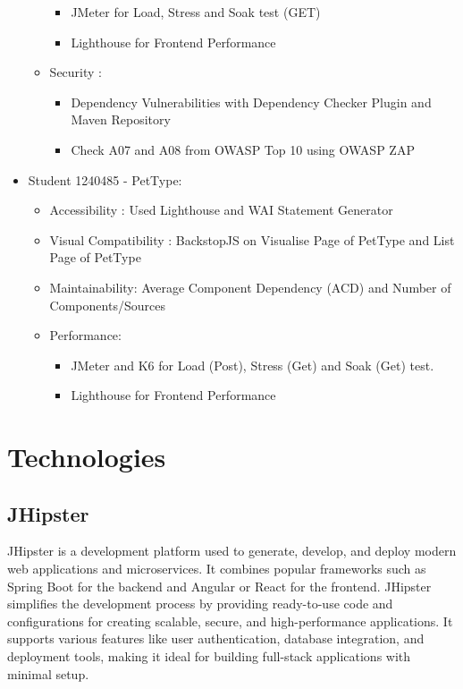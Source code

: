 \documentclass[a4paper,11pt,openright,BCOR=15mm]{scrbook}
\begin{document}
\begin{itemize}
\begin{itemize}
				\begin{itemize}
					\item JMeter for Load, Stress and Soak test (GET)
					\item Lighthouse for Frontend Performance
				\end{itemize}	
				\item Security : 
				\begin{itemize}
					\item Dependency Vulnerabilities with Dependency
					Checker Plugin and Maven Repository
					\item Check A07 and A08 from OWASP Top 10 using OWASP ZAP
				\end{itemize}	
			\end{itemize}
			\item Student 1240485 - PetType:
			\begin{itemize}
				\item Accessibility : Used Lighthouse and WAI Statement Generator
				\item Visual Compatibility : BackstopJS on Visualise Page of PetType and List Page of PetType
				\item Maintainability: Average Component Dependency (ACD) and Number of Components/Sources
				\item Performance:
				\begin{itemize}
					\item JMeter and K6 for Load (Post), Stress (Get) and Soak (Get) test.
					\item Lighthouse for Frontend Performance
				\end{itemize}
			\end{itemize}	
		\end{itemize}
		

	
	
	
	\chapter{Technologies }
	 \section{JHipster}
	 JHipster is a development platform used to generate, develop, and deploy modern web applications and microservices. It combines popular frameworks such as Spring Boot for the backend and Angular or React for the frontend. JHipster simplifies the development process by providing ready-to-use code and configurations for creating scalable, secure, and high-performance applications. It supports various features like user authentication, database integration, and deployment tools, making it ideal for building full-stack applications with minimal setup.
	 
\end{document}

